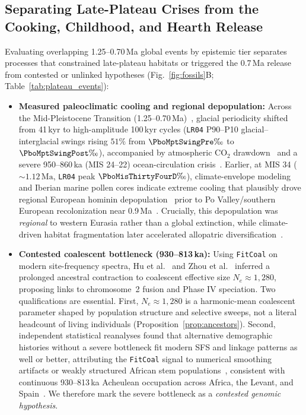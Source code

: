 \subsection{Separating Late-Plateau Crises from the Cooking, Childhood, and Hearth Release}
Evaluating overlapping 1.25--0.70\,Ma global events by epistemic tier separates processes that constrained late-plateau habitats or triggered the 0.7\,Ma release from contested or unlinked hypotheses (Fig.~\ref{fig:fossils}B; Table~\ref{tab:plateau_events}):
\begin{itemize}[leftmargin=1.3em,itemsep=1.5pt,topsep=2pt]
\item \textbf{Measured paleoclimatic cooling and regional depopulation:} Across the Mid-Pleistocene Transition (1.25--0.70\,Ma)~\cite{clark2006}, glacial periodicity shifted from 41\,kyr to high-amplitude 100\,kyr cycles (\texttt{LR04} P90--P10 glacial--interglacial swings rising $51\%$ from $\PboMptSwingPre\text{\textperthousand}$ to $\PboMptSwingPost\text{\textperthousand}$), accompanied by atmospheric $\mathrm{CO}_2$ drawdown~\cite{chalk2017,yan2019} and a severe 950--860\,ka (MIS 24--22) ocean-circulation crisis~\cite{pena2014}. Earlier, at MIS 34 ($\sim\!1.12\,\mathrm{Ma}$, \texttt{LR04} peak $\PboMisThirtyFourD\text{\textperthousand}$), climate-envelope modeling and Iberian marine pollen cores indicate extreme cooling that plausibly drove regional European hominin depopulation~\cite{margari2023} prior to Po Valley/southern European recolonization near 0.9\,Ma~\cite{muttoni2024}. Crucially, this depopulation was \emph{regional} to western Eurasia rather than a global extinction, while climate-driven habitat fragmentation later accelerated allopatric diversification~\cite{timmermann2022,ao2026}.
\item \textbf{Contested coalescent bottleneck (930--813\,ka):} Using \texttt{FitCoal} on modern site-frequency spectra, Hu et al.~\cite{hu2023} and Zhou et al.~\cite{zhou2026} inferred a prolonged ancestral contraction to coalescent effective size $N_e\approx 1{,}280$, proposing links to chromosome~2 fusion and Phase IV speciation. Two qualifications are essential. First, $N_e\approx 1{,}280$ is a harmonic-mean coalescent parameter shaped by population structure and selective sweeps, not a literal headcount of living individuals (Proposition~\ref{prop:ancestors}). Second, independent statistical reanalyses found that alternative demographic histories without a severe bottleneck fit modern SFS and linkage patterns as well or better, attributing the \texttt{FitCoal} signal to numerical smoothing artifacts or weakly structured African stem populations~\cite{deng2025,cousins2025,terhorst2025,ragsdale2023,cousins2024}, consistent with continuous 930--813\,ka Acheulean occupation across Africa, the Levant, and Spain~\cite{goreninbar2000,pares2013}. We therefore mark the severe bottleneck as a \emph{contested genomic hypothesis}.

\end{itemize}
